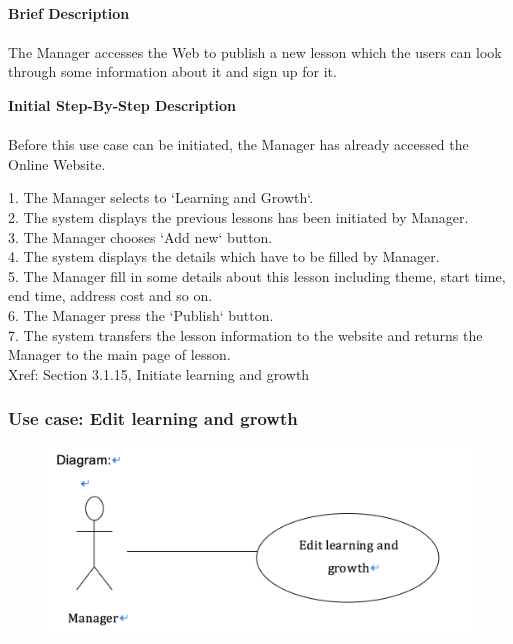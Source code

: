 \documentclass[12pt]{report}
\begin{document}
\paragraph{}
\begin{flushleft}
\textbf{Brief Description }
\paragraph{}
The Manager accesses the Web to publish a new lesson which the users can look through some information about it and sign up for it. \\

\begin{flushleft}
\textbf{Initial Step-By-Step Description }
\paragraph{}
Before this use case can be initiated, the Manager has already accessed the Online Website.

\begin{flushleft}
1. The Manager selects to `Learning and Growth`. \\
2. The system displays the previous lessons has been initiated by Manager. \\
3. The Manager chooses `Add new` button. \\
4. The system displays the details which have to be filled by Manager. \\
5. The Manager fill in some details about this lesson including theme, start time, end time, address cost and so on. \\
6. The Manager press the `Publish` button. \\
7. The system transfers the lesson information to the website and returns the Manager to the main page of lesson. \\
Xref: Section 3.1.15, Initiate learning and growth


\end{flushleft}
\end{flushleft}
\end{flushleft}

\newpage
\subsubsection{Use case:  Edit learning and growth}

\begin{figure}[!htb]
  \includegraphics{22.PNG}
\end{figure}
\end{document}
